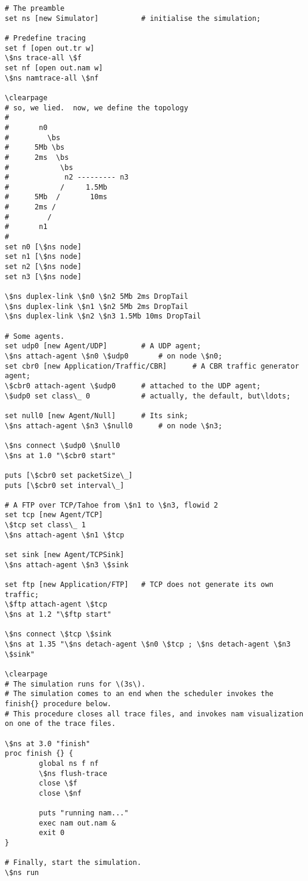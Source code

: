 \begin{verbatim}
# The preamble
set ns [new Simulator]			# initialise the simulation;

# Predefine tracing
set f [open out.tr w]
\$ns trace-all \$f
set nf [open out.nam w]
\$ns namtrace-all \$nf

\clearpage
# so, we lied.  now, we define the topology
#
#       n0
#         \bs
#      5Mb \bs
#      2ms  \bs
#            \bs
#             n2 --------- n3
#            /     1.5Mb
#      5Mb  /       10ms
#      2ms /
#         /
#       n1
#
set n0 [\$ns node]
set n1 [\$ns node]
set n2 [\$ns node]
set n3 [\$ns node]

\$ns duplex-link \$n0 \$n2 5Mb 2ms DropTail
\$ns duplex-link \$n1 \$n2 5Mb 2ms DropTail
\$ns duplex-link \$n2 \$n3 1.5Mb 10ms DropTail

# Some agents.
set udp0 [new Agent/UDP]		# A UDP agent;
\$ns attach-agent \$n0 \$udp0		# on node \$n0;
set cbr0 [new Application/Traffic/CBR]		# A CBR traffic generator agent;
\$cbr0 attach-agent \$udp0		# attached to the UDP agent;
\$udp0 set class\_ 0			# actually, the default, but\ldots;

set null0 [new Agent/Null]		# Its sink;
\$ns attach-agent \$n3 \$null0		# on node \$n3;

\$ns connect \$udp0 \$null0
\$ns at 1.0 "\$cbr0 start"

puts [\$cbr0 set packetSize\_]
puts [\$cbr0 set interval\_]

# A FTP over TCP/Tahoe from \$n1 to \$n3, flowid 2
set tcp [new Agent/TCP]
\$tcp set class\_ 1
\$ns attach-agent \$n1 \$tcp

set sink [new Agent/TCPSink]
\$ns attach-agent \$n3 \$sink

set ftp [new Application/FTP]	# TCP does not generate its own traffic;
\$ftp attach-agent \$tcp
\$ns at 1.2 "\$ftp start"

\$ns connect \$tcp \$sink
\$ns at 1.35 "\$ns detach-agent \$n0 \$tcp ; \$ns detach-agent \$n3 \$sink"

\clearpage
# The simulation runs for \(3s\).
# The simulation comes to an end when the scheduler invokes the finish{} procedure below.
# This procedure closes all trace files, and invokes nam visualization on one of the trace files.

\$ns at 3.0 "finish"
proc finish {} {
        global ns f nf
        \$ns flush-trace
        close \$f
        close \$nf

        puts "running nam..."
        exec nam out.nam &
        exit 0
}

# Finally, start the simulation.
\$ns run

\end{verbatim}
